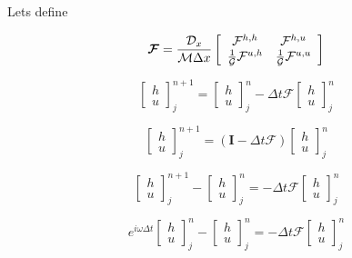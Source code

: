 \documentclass[12pt]{article}
\begin{document}
Lets define

\[\boldsymbol{\mathcal{F}} = \frac{\mathcal{D}_x}{\mathcal{M}\Delta x}\left[\begin{array}{c c}
\mathcal{F}^{h,h} & \mathcal{F}^{h,u} \\ \frac{1}{\mathcal{G}}\mathcal{F}^{u,h} &  \frac{1}{\mathcal{G}}\mathcal{F}^{u,u} 
\end{array}\right] \]

\[\left[\begin{array}{c}
h \\ u
\end{array}\right]^{n+1}_j = \left[\begin{array}{c}
h \\ u
\end{array}\right]^{n}_j - \Delta t\boldsymbol{\mathcal{F}}\left[\begin{array}{c}
h \\ u
\end{array}\right]^{n}_j  \]

\[\left[\begin{array}{c}
h \\ u
\end{array}\right]^{n+1}_j = \left(\boldsymbol{I} - \Delta t\boldsymbol{\mathcal{F}} \right)\left[\begin{array}{c}
h \\ u
\end{array}\right]^{n}_j  \]


\[\left[\begin{array}{c}
h \\ u
\end{array}\right]^{n+1}_j - \left[\begin{array}{c}
h \\ u
\end{array}\right]^{n}_j  = - \Delta t\boldsymbol{\mathcal{F}}\left[\begin{array}{c}
h \\ u
\end{array}\right]^{n}_j  \]

\[e^{i\omega \Delta t}\left[\begin{array}{c}
h \\ u
\end{array}\right]^{n}_j - \left[\begin{array}{c}
h \\ u
\end{array}\right]^{n}_j  = - \Delta t\boldsymbol{\mathcal{F}}\left[\begin{array}{c}
h \\ u
\end{array}\right]^{n}_j  \]
\end{document}
